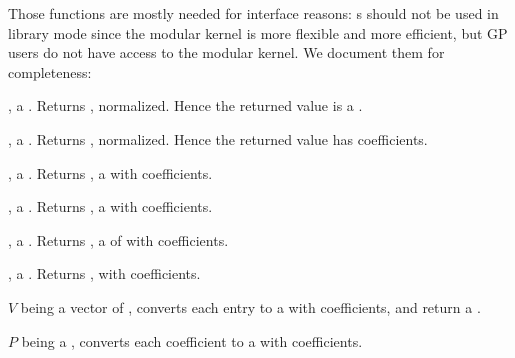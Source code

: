 

Those functions are mostly needed for interface reasons: s should
not be used in library mode since the modular kernel is more flexible and more
efficient, but GP users do not have access to the modular kernel.
We document them for completeness:

,  a . Returns , normalized. Hence the returned value is a .

,  a . Returns , normalized. Hence the returned value has  coefficients.

,  a . Returns , a  with  coefficients.

,  a . Returns , a  with  coefficients.

,  a . Returns , a  of  with  coefficients.

,  a . Returns , with  coefficients.











 $V$ being a vector of ,
converts each entry to a  with  coefficients, and return
a .

$P$ being a , converts each coefficient to a  with
 coefficients.

